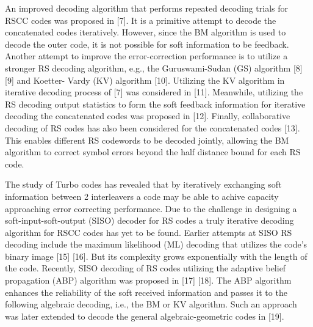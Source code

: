 \documentclass[fontsize=12pt]{article}
\begin{document}
An
improved decoding algorithm that performs repeated decoding
trials for RSCC codes was proposed in [7]. 
It is a primitive
attempt to decode the concatenated codes iteratively.
However, since the BM algorithm is used to decode the
outer code, it is not possible for soft information to be feedback. Another attempt to improve the error-correction
performance is to utilize a stronger RS decoding algorithm,
e.g., the Guruswami-Sudan (GS) algorithm [8] [9] and Koetter-
Vardy (KV) algorithm [10]. Utilizing the KV algorithm in iterative decoding process of [7] was considered in [11].
Meanwhile, utilizing the RS decoding output statistics to
form the soft feedback information for iterative decoding the
concatenated codes was proposed in [12]. Finally, collaborative
decoding of RS codes has also been considered for the
concatenated codes [13]. This enables different RS codewords
to be decoded jointly, allowing the BM algorithm to correct
symbol errors beyond the half distance bound for each RS
code.

The study of Turbo codes has revealed that by iteratively exchanging soft information between 2 interleavers a code may be able to achive capacity approaching error correcting performance. Due to the challenge in designing a soft-input-soft-output (SISO) decoder for RS codes a truly iterative decoding algorithm for RSCC codes has yet to be found. Earlier attempts at SISO RS decoding include the maximum likelihood (ML)
decoding that utilizes the code’s binary image [15] [16]. But
its complexity grows exponentially with the length of the code.
Recently, SISO decoding of RS codes utilizing the adaptive
belief propagation (ABP) algorithm was proposed in [17] [18].
The ABP algorithm enhances the reliability of the soft received
information and passes it to the following algebraic decoding,
i.e., the BM or KV algorithm. Such an approach was later
extended to decode the general algebraic-geometric codes
in [19].
\end{document}
